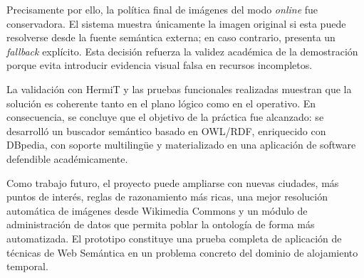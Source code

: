 Precisamente por ello, la política final de imágenes del modo \textit{online} fue
conservadora. El sistema muestra únicamente la imagen original si esta puede resolverse
desde la fuente semántica externa; en caso contrario, presenta un \textit{fallback}
explícito. Esta decisión refuerza la validez académica de la demostración porque evita
introducir evidencia visual falsa en recursos incompletos.

La validación con HermiT y las pruebas funcionales realizadas muestran que la solución es
coherente tanto en el plano lógico como en el operativo. En consecuencia, se concluye
que el objetivo de la práctica fue alcanzado: se desarrolló un buscador semántico basado
en OWL/RDF, enriquecido con DBpedia, con soporte multilingüe y materializado en una
aplicación de software defendible académicamente.

Como trabajo futuro, el proyecto puede ampliarse con nuevas ciudades, más puntos de
interés, reglas de razonamiento más ricas, una mejor resolución automática de imágenes desde Wikimedia Commons y un módulo de
administración de datos que permita poblar la ontología de forma más automatizada. El prototipo constituye una prueba completa de
aplicación de técnicas de Web Semántica en un problema concreto del dominio de
alojamiento temporal.
